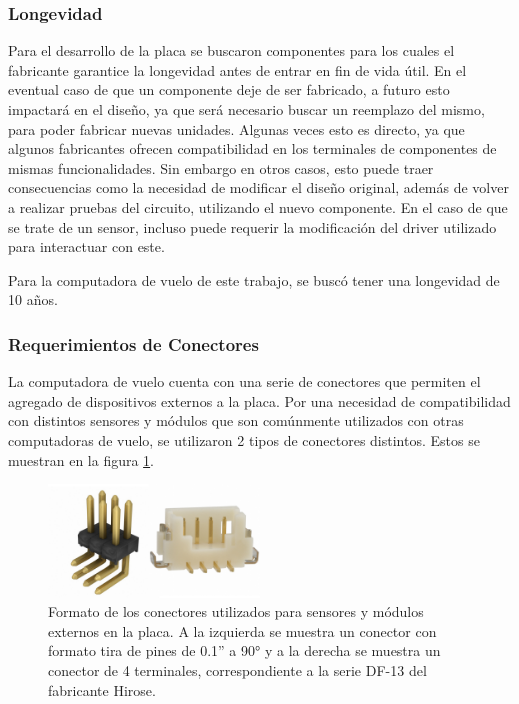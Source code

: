 
\subsubsection{Longevidad}


Para el desarrollo de la placa se buscaron componentes para los cuales el fabricante garantice la longevidad antes de entrar en fin de vida útil. En el eventual caso de que un componente deje de ser fabricado, a futuro esto impactará en el diseño, ya que será necesario buscar un reemplazo del mismo, para poder fabricar nuevas unidades. Algunas veces esto es directo, ya que algunos fabricantes ofrecen compatibilidad en los terminales de componentes de mismas funcionalidades. Sin embargo en otros casos, esto puede traer consecuencias como la necesidad de modificar el diseño original, además de volver a realizar pruebas del circuito, utilizando el nuevo componente. En el caso de que se trate de un sensor, incluso puede requerir la modificación del driver utilizado para interactuar con este.

Para la computadora de vuelo de este trabajo, se buscó tener una longevidad de 10 años.


\subsubsection{Requerimientos de Conectores}

La computadora de vuelo cuenta con una serie de conectores que permiten el agregado de dispositivos externos a la placa. Por una necesidad de compatibilidad con distintos sensores y módulos que son comúnmente utilizados con otras computadoras de vuelo, se utilizaron 2 tipos de conectores distintos. Estos se muestran en la figura \ref{fig:conectores_dupon_df_13}.

\begin{figure}[H]
    \centering
    \includegraphics[width=0.5\textwidth]{img/conectores_dupon_df_13.png}
    \caption{Formato de los conectores utilizados para sensores y módulos externos en la placa. A la izquierda se muestra un conector con formato tira de pines de 0.1” a 90° y a la derecha se muestra un conector de 4 terminales, correspondiente a la serie DF-13 del fabricante Hirose.}
    \label{fig:conectores_dupon_df_13}
\end{figure}

